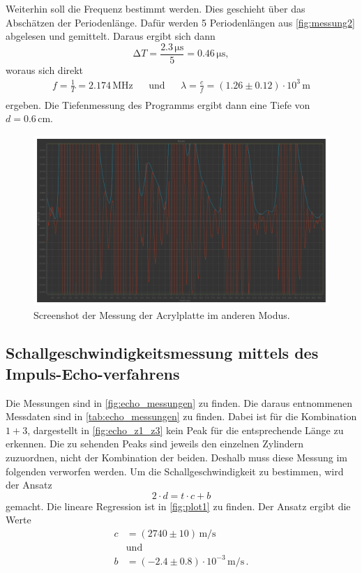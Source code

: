 Weiterhin soll die Frequenz bestimmt werden.
Dies geschieht über das Abschätzen der Periodenlänge.
Dafür werden 5 Periodenlängen aus \autoref{fig:messung2} abgelesen und gemittelt.
Daraus ergibt sich dann
\begin{equation*}
  \increment T = \frac{2.3 \, \unit{\micro\second}}{5} = 0.46 \, \unit{\micro\second},
\end{equation*}
woraus sich direkt
\begin{align*}
  f = \frac{1}{T} = 2.174 \, \unit{\mega\hertz} && \text{und} && \lambda = \frac{c}{f} = (1.26 \pm 0.12) \cdot 10^3 \, \unit\meter\\
\end{align*}
ergeben.
Die Tiefenmessung des Programms ergibt dann eine Tiefe von $d = 0.6 \, \unit{\centi\meter}$.


\begin{figure} [H]
  \centering
  \includegraphics[width =\linewidth]{pictures/Schallgeschwindigkeit/Messung2.pdf}
  \caption{Screenshot der Messung der Acrylplatte im anderen Modus.}
  \label{fig:messung2}
\end{figure}


\subsection{Schallgeschwindigkeitsmessung mittels des Impuls-Echo-verfahrens}

Die Messungen sind in \autoref{fig:echo_messungen} zu finden.
Die daraus entnommenen Messdaten sind in \autoref{tab:echo_messungen} zu finden.
Dabei ist für die Kombination $1 + 3$, dargestellt in \autoref{fig:echo_z1_z3} kein Peak für die entsprechende Länge zu erkennen.
Die zu sehenden Peaks sind jeweils den einzelnen Zylindern zuzuordnen, nicht der Kombination der beiden.
Deshalb muss diese Messung im folgenden verworfen werden.
Um die Schallgeschwindigkeit zu bestimmen, wird der Ansatz
\begin{equation*}
  2 \cdot d = t \cdot c + b
\end{equation*}
gemacht. Die lineare Regression ist in \autoref{fig:plot1} zu finden.
Der Ansatz ergibt die Werte
\begin{align*}
  c &= (2740 \pm 10)  \, \unit{\meter / \second}\\
  &\text{und}\\
  b &= (-2.4 \pm 0.8) \cdot 10^{-3} \, \unit{\meter / \second} \, .
\end{align*}

